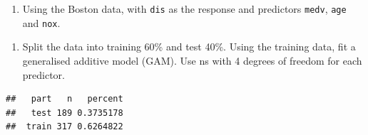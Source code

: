 \documentclass[]{article}
\newenvironment{Shaded}{\begin{snugshade}}{\end{snugshade}}
\newcommand{\DataTypeTok}[1]{\textcolor[rgb]{0.13,0.29,0.53}{#1}}
\newcommand{\FloatTok}[1]{\textcolor[rgb]{0.00,0.00,0.81}{#1}}
\newcommand{\KeywordTok}[1]{\textcolor[rgb]{0.13,0.29,0.53}{\textbf{#1}}}
\newcommand{\NormalTok}[1]{#1}
\newcommand{\OperatorTok}[1]{\textcolor[rgb]{0.81,0.36,0.00}{\textbf{#1}}}
\newcommand{\StringTok}[1]{\textcolor[rgb]{0.31,0.60,0.02}{#1}}
\providecommand{\tightlist}{%
  \setlength{\itemsep}{0pt}\setlength{\parskip}{0pt}}
\begin{document}
\begin{enumerate}
\def\labelenumi{\arabic{enumi}.}
\setcounter{enumi}{1}
\tightlist
\item
  Using the Boston data, with \texttt{dis} as the response and
  predictors \texttt{medv}, \texttt{age} and \texttt{nox}.
\end{enumerate}

\begin{enumerate}
\def\labelenumi{(\alph{enumi})}
\tightlist
\item
  Split the data into training 60\% and test 40\%. Using the training
  data, fit a generalised additive model (GAM). Use ns with 4 degrees of
  freedom for each predictor.
\end{enumerate}

\begin{Shaded}
\end{Shaded}

\begin{verbatim}
##   part   n   percent
##   test 189 0.3735178
##  train 317 0.6264822
\end{verbatim}
\end{document}
